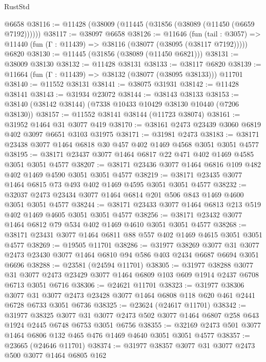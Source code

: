 \begin{lexlean}{RustStd}
\begin{coremodule}
    @6658
@38116 := @11428 (@38009 (@11445 (@31856 (@38089 (@11450 (@6659 @7192))))))
@38117 := @38097 @6658
@38126 := @11646
    (fun (tail : @3057) => @11440 (fun (Γ : @11439) => @38116 (@38077 (@38095 (@38117 @7192)))))
    @6820
@38130 := @11445 (@31856 (@38089 (@11450 @6821)))
@38131 := @38009 @38130
@38132 := @11428 @38131
@38133 := @38117 @6820
@38139 := @11664 (fun (Γ : @11439) => @38132 (@38077 (@38095 @38133))) @11701
@38140 := @11552 @38131
@38141 := @38075 @31931
@38142 := @11428 @38141
@38143 := @31934 @23072
@38144 := @38143 @38133
@38153 := @38140 (@38142 @38144) (@7338 @10433 @10429 @38130 @10440 (@7206 @38130))
@38157 := @11552 @38141 @38144 (@11723 @38074)
@38161 := @31952 @1464 @31 @3077 @419
@38170 := @38161 @2473 @23439 @3060 @6819 @402 @3097 @6651 @3103 @31975
@38171 := @31981 @2473
@38183 := @38171 @23438 @3077 @1464 @6818 @30 @457 @402 @1469 @4568 @3051 @3051 @4577
@38195 := @38171 @23437 @3077 @1464 @6817 @22 @471 @402 @1469 @4585 @3051 @3051 @4577
@38207 := @38171 @23436 @3077 @1464 @6816 @109 @482 @402 @1469 @4590 @3051 @3051 @4577
@38219 := @38171 @23435 @3077 @1464 @6815 @73 @493 @402 @1469 @4595 @3051 @3051 @4577
@38232 := @32037 @2473 @23434 @3077 @1464 @6814 @201 @506 @843 @1469 @4600 @3051 @3051 @4577
@38244 := @38171 @23433 @3077 @1464 @6813 @213 @519 @402 @1469 @4605 @3051 @3051 @4577
@38256 := @38171 @23432 @3077 @1464 @6812 @79 @534 @402 @1469 @4610 @3051 @3051 @4577
@38268 := @38171 @23431 @3077 @1464 @6811 @88 @557 @402 @1469 @4615 @3051 @3051 @4577
@38269 := @19505 @11701
@38286 := @31977
    @38269
    @3077
    @31
    @3077
    @2473
    @23430
    @3077
    @1464
    @6810
    @94
    @586
    @403
    @2434
    @6687
    @6694
    @3051
    @6696
@38288 := @23581 (@24594 @11701)
@38305 := @31977
    @38288
    @3077
    @31
    @3077
    @2473
    @23429
    @3077
    @1464
    @6809
    @103
    @609
    @1914
    @2437
    @6708
    @6713
    @3051
    @6716
@38306 := @24621 @11701
@38323 := @31977
    @38306
    @3077
    @31
    @3077
    @2473
    @23428
    @3077
    @1464
    @6808
    @118
    @620
    @461
    @2441
    @6728
    @6733
    @3051
    @6736
@38325 := @23624 (@24617 @11701)
@38342 := @31977
    @38325
    @3077
    @31
    @3077
    @2473
    @502
    @3077
    @1464
    @6807
    @258
    @643
    @1924
    @2445
    @6748
    @6753
    @3051
    @6756
@38355 := @32169 @2473 @501 @3077 @1464 @6806 @132 @465 @476 @1469 @4640 @3051 @3051 @4577
@38357 := @23665 (@24646 @11701)
@38374 := @31977
    @38357
    @3077
    @31
    @3077
    @2473
    @500
    @3077
    @1464
    @6805
    @162

\end{coremodule}
\end{lexlean}
